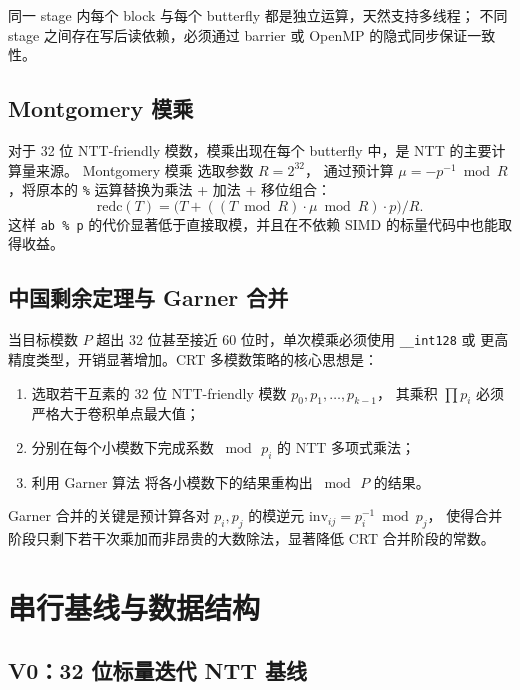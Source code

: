 \documentclass[UTF8,a4paper,10pt]{ctexart}
\begin{document}
同一 stage 内每个 block 与每个 butterfly 都是独立运算，天然支持多线程；
不同 stage 之间存在写后读依赖，必须通过 barrier 或 OpenMP 的隐式同步保证一致性。

\subsection{Montgomery 模乘}

对于 32 位 NTT-friendly 模数，模乘出现在每个 butterfly 中，是 NTT 的主要计算量来源。
Montgomery 模乘\cite{montgomery1985modular} 选取参数 $R = 2^{32}$，
通过预计算 $\mu = -p^{-1} \bmod R$，将原本的 \texttt{\%} 运算替换为乘法 + 加法 + 移位组合：
\[
  \mathrm{redc}(T) = \bigl(T + ((T \bmod R) \cdot \mu \bmod R) \cdot p\bigr) / R.
\]
这样 \texttt{ab \% p} 的代价显著低于直接取模，并且在不依赖 SIMD 的标量代码中也能取得收益。

\subsection{中国剩余定理与 Garner 合并}

当目标模数 $P$ 超出 32 位甚至接近 60 位时，单次模乘必须使用 \texttt{\_\_int128} 或
更高精度类型，开销显著增加。CRT 多模数策略的核心思想是：

\begin{enumerate}
  \item 选取若干互素的 32 位 NTT-friendly 模数 $p_0, p_1, \dots, p_{k-1}$，
        其乘积 $\prod p_i$ 必须严格大于卷积单点最大值；
  \item 分别在每个小模数下完成系数 $\bmod\, p_i$ 的 NTT 多项式乘法；
  \item 利用 Garner 算法\cite{knuth1997art} 将各小模数下的结果重构出 $\bmod\, P$ 的结果。
\end{enumerate}

Garner 合并的关键是预计算各对 $p_i, p_j$ 的模逆元 $\mathrm{inv}_{ij} = p_i^{-1} \bmod p_j$，
使得合并阶段只剩下若干次乘加而非昂贵的大数除法，显著降低 CRT 合并阶段的常数。

\section{串行基线与数据结构}

\subsection{V0：32 位标量迭代 NTT 基线}
\end{document}
